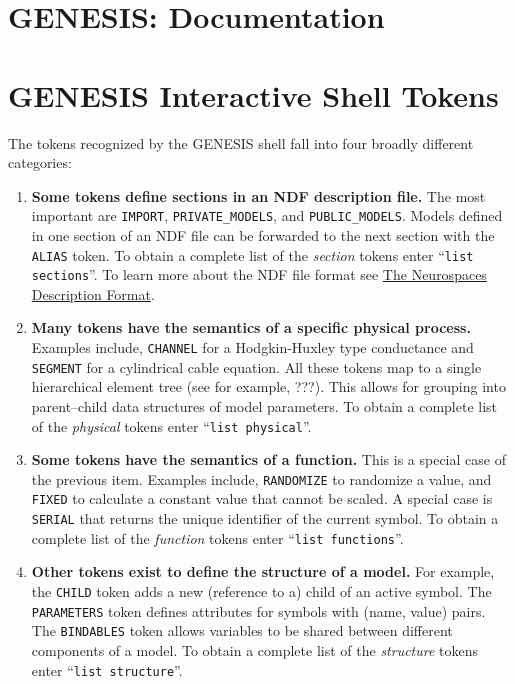 \documentclass[12pt]{article}
\begin{document}
\section*{GENESIS: Documentation}

\section*{GENESIS Interactive Shell Tokens}

The tokens recognized by the GENESIS shell fall into four broadly different categories:

\begin{enumerate}

\item {\bf Some tokens define sections in an NDF description file.} The most important are {\tt IMPORT}, {\tt PRIVATE\_MODELS}, and {\tt PUBLIC\_MODELS}. Models defined in one section of an NDF file can be forwarded to the next section with the {\tt ALIAS} token. To obtain a complete list of the {\it section} tokens enter ``{\tt list sections}''. To learn more about the NDF file format see \href{../document-ndf-file-format/document-ndf-file-format.pdf}{The Neurospaces Description Format}.

\item {\bf Many tokens have the semantics of a specific physical process.} Examples include, {\tt CHANNEL} for a Hodgkin-Huxley type conductance and {\tt SEGMENT} for a cylindrical cable equation. All these tokens map to a single hierarchical element tree (see for example, ???). This allows for grouping into parent--child data structures of model parameters. To obtain a complete list of the {\it physical} tokens enter ``{\tt list physical}''.

\item {\bf Some tokens have the semantics of a function.} This is a special case of the previous item. Examples include, {\tt RANDOMIZE} to randomize a value, and {\tt FIXED} to calculate a constant value that cannot be scaled. A special case is {\tt SERIAL} that returns the unique identifier  of the current symbol.  To obtain a complete list of the {\it  function} tokens enter ``{\tt list functions}''.

\item {\bf Other tokens exist to define the structure of a model.} For example, the {\tt CHILD} token adds a new (reference to a) child of an active symbol. The {\tt PARAMETERS} token defines attributes for symbols with (name, value) pairs. The {\tt BINDABLES} token allows variables to be shared between different components of a model. To obtain a complete list of the {\it structure} tokens enter ``{\tt list structure}''.

\end{enumerate}
\end{document}

